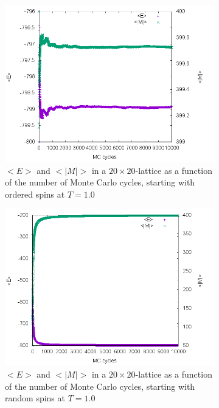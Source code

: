 \documentclass[10pt,a4paper]{article}
\begin{document}
\begin{figure}[h]
\centering
\begin{subfigure}{0.45\textwidth}
	\includegraphics[width=\textwidth]{a1o.png}
	\caption{$<E>$ and $<|M|>$ in a $20\times 20$-lattice as a function of the number of Monte Carlo cycles, starting with ordered spins at $T=1.0$ \label{c_1}}
\end{subfigure}
\begin{subfigure}{0.45\textwidth}
	\includegraphics[width=\textwidth]{a1r.png}
	\caption{$<E>$ and $<|M|>$ in a $20\times 20$-lattice as a function of the number of Monte Carlo cycles, starting with random spins at $T=1.0$\label{c_2}}
\end{subfigure}
\begin{subfigure}{0.45\textwidth}

\end{subfigure}
\end{figure}
\end{document}
